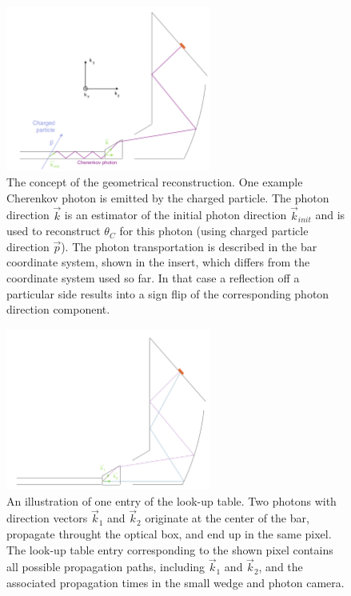 \begin{figure}[!h]
\centering
\includegraphics[width=0.6\textwidth]{pics/lut3.png}
\caption{\label{pic:lut1}
The concept of the geometrical reconstruction. One example Cherenkov photon is emitted by the charged particle. The photon direction $\vec k$ is an estimator of the initial photon direction $\vec k_{init}$ and is used to reconstruct $\theta_{C}$ for this photon (using charged particle direction $\vec p$). The photon transportation is described in the bar coordinate system, shown in the insert, which differs from the \gluex coordinate system used so far. In that case a reflection off a particular side results into a sign flip of the corresponding photon direction component.
}
\end{figure}

\begin{figure}[!h]
\centering
\includegraphics[width=0.6\textwidth]{pics/lut1.png}
\caption{\label{pic:lut2}
An illustration of one entry of the look-up table. Two photons with direction vectors $\vec k_{1}$ and $\vec k_{2}$ originate at the center of the bar, propagate throught the optical box, and end up in the same pixel. The look-up table entry corresponding to the shown pixel contains all possible propagation paths, including $\vec k_{1}$ and $\vec k_{2}$, and the associated propagation times in the small wedge and photon camera.
}
\end{figure}

